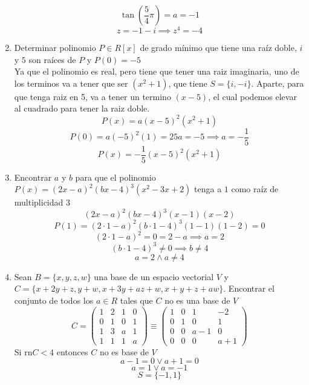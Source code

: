 \documentclass[../practica.root.tex]{subfiles}
\begin{document}
\begin{enumerate}
\begin{center}
          \end{center}
          \[
              \tan\left(\frac{5}{4}\pi\right) = a = -1
          \] \[
              z = -1 - i \implies \boxed{z^4 = -4}
          \]


    \item Determinar polinomio $P \in R[x]$ de grado mínimo que tiene una raíz doble, $i$ y $5$ son raíces de $P$ y $P(0) = -5$ \\
          Ya que el polinomio es real, pero tiene que tener una raiz imaginaria, uno de los terminos va a tener que ser $(x^2 + 1)$, que tiene $S = \{i, -i\}$. Aparte, para que tenga raiz en 5, va a tener un termino $(x-5)$, el cual podemos elevar al cuadrado para tener la raiz doble.
          \[ P(x) = a(x-5)^2(x^2+1) \]
          \[ P(0) = a(-5)^2(1) = 25a = -5 \implies a = -\frac{1}{5} \]
          \[ P(x) = -\frac{1}{5}(x-5)^2(x^2+1) \]

    \item Encontrar $a$ y $b$ para que el polinomio $P(x) = (2x-a)^2(bx-4)^3(x^2-3x+2)$ tenga a $1$ como raíz de multiplicidad $3$ %
          \[ (2x - a)^2 (bx - 4)^3 (x - 1)(x - 2) \]
          \[ P(1) = (2\cdot 1 - a)^2 (b\cdot 1 - 4)^3 (1 - 1)(1 - 2) = 0 \]
          \[ (2\cdot 1 - a)^2 = 0 = 2 - a \implies a = 2 \]
          \[ (b\cdot 1 - 4)^3 \neq 0 \implies b \neq 4 \]
          \[ \boxed{a = 2 \land a \neq 4} \]

    \item Sean $B = \{x, y, z, w\}$ una base de un espacio vectorial $V$ y $C = \{x + 2y + z,y + w,x + 3y + az + w,x + y + z + aw\}$. Encontrar el conjunto de todos los $a \in R$ tales que $C$ no es una base de $V$ %
          \[
              C = \begin{pmatrix}
                  1 & 2 & 1 & 0 \\
                  0 & 1 & 0 & 1 \\
                  1 & 3 & a & 1 \\
                  1 & 1 & 1 & a
              \end{pmatrix}
              \equiv
              \begin{pmatrix}
                  1 & 0 & 1   & -2  \\
                  0 & 1 & 0   & 1   \\
                  0 & 0 & a-1 & 0   \\
                  0 & 0 & 0   & a+1
              \end{pmatrix}
          \]
          Si \(\text{rn} C < 4\) entonces \(C\) no es base de \(V\)
          \[ a - 1 = 0 \lor a + 1 = 0\]
          \[ a = 1 \lor a = - 1 \]
          \[ \boxed{S = \{-1, 1\}} \]


\end{enumerate}
\end{document}
